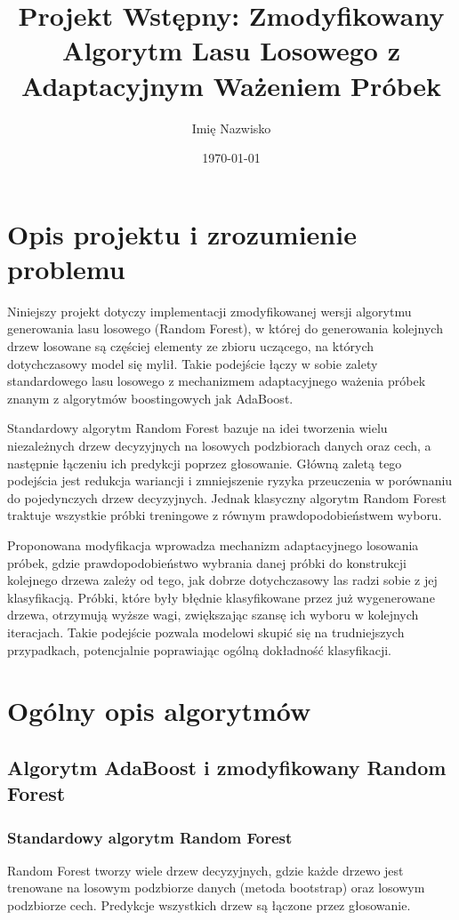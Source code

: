 \documentclass[12pt,a4paper]{article}
\title{Projekt Wstępny: Zmodyfikowany Algorytm Lasu Losowego z Adaptacyjnym Ważeniem Próbek}
\author{Imię Nazwisko}
\date{\today}
\begin{document}
\maketitle
\tableofcontents
\newpage

\section{Opis projektu i zrozumienie problemu}

Niniejszy projekt dotyczy implementacji zmodyfikowanej wersji algorytmu generowania lasu losowego (Random Forest), w której do generowania kolejnych drzew losowane są częściej elementy ze zbioru uczącego, na których dotychczasowy model się mylił. Takie podejście łączy w sobie zalety standardowego lasu losowego z mechanizmem adaptacyjnego ważenia próbek znanym z algorytmów boostingowych jak AdaBoost.

Standardowy algorytm Random Forest bazuje na idei tworzenia wielu niezależnych drzew decyzyjnych na losowych podzbiorach danych oraz cech, a następnie łączeniu ich predykcji poprzez głosowanie. Główną zaletą tego podejścia jest redukcja wariancji i zmniejszenie ryzyka przeuczenia w porównaniu do pojedynczych drzew decyzyjnych. Jednak klasyczny algorytm Random Forest traktuje wszystkie próbki treningowe z równym prawdopodobieństwem wyboru.

Proponowana modyfikacja wprowadza mechanizm adaptacyjnego losowania próbek, gdzie prawdopodobieństwo wybrania danej próbki do konstrukcji kolejnego drzewa zależy od tego, jak dobrze dotychczasowy las radzi sobie z jej klasyfikacją. Próbki, które były błędnie klasyfikowane przez już wygenerowane drzewa, otrzymują wyższe wagi, zwiększając szansę ich wyboru w kolejnych iteracjach. Takie podejście pozwala modelowi skupić się na trudniejszych przypadkach, potencjalnie poprawiając ogólną dokładność klasyfikacji.

\section{Ogólny opis algorytmów}

\subsection{Algorytm AdaBoost i zmodyfikowany Random Forest}

\subsubsection{Standardowy algorytm Random Forest}
Random Forest tworzy wiele drzew decyzyjnych, gdzie każde drzewo jest trenowane na losowym podzbiorze danych (metoda bootstrap) oraz losowym podzbiorze cech. Predykcje wszystkich drzew są łączone przez głosowanie.
\end{document}
